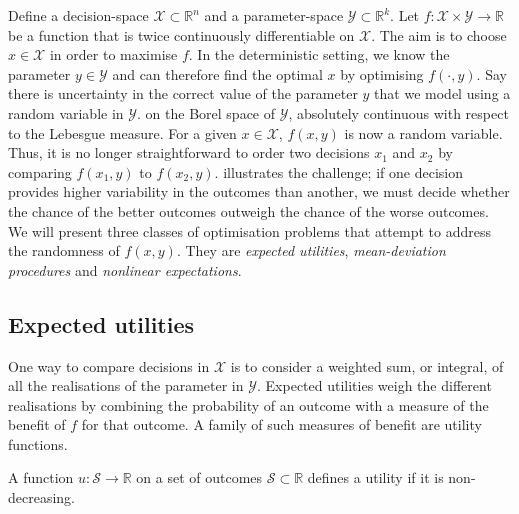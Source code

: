\documentclass[main.tex]{subfiles}
\begin{document}
Define a decision-space $\mathcal{X}\subset \mathbb{R}^n$ and a
parameter-space $\mathcal{Y}\subset \mathbb{R}^k$.
Let $f:\mathcal{X}\times\mathcal{Y}\to\mathbb{R}$ be a function that
is twice continuously differentiable on $\mathcal{X}$.
The aim is to choose $x\in\mathcal{X}$ in order to maximise $f$.
In the deterministic setting, we know the parameter
$y\in\mathcal{Y}$ and can therefore find the optimal $x$ by optimising
$f(\cdot,y)$.
Say there is uncertainty in the correct value of the parameter $y$ that
we model using a random variable in $\mathcal{Y}$.
on the Borel space of $\mathcal{Y}$, absolutely continuous with respect
to the Lebesgue measure.
For a given $x\in\mathcal{X}$, $f(x,y)$ is now a random variable.
Thus, it is no longer straightforward to order two decisions $x_1$ and
$x_2$ by comparing $f(x_1,y)$ to $f(x_2,y)$.
 illustrates the challenge;
if one decision provides higher variability in the outcomes than
another, we must decide whether the chance of the better outcomes
outweigh the chance of the worse outcomes.
We will present three classes of optimisation problems that attempt to
address the randomness of $f(x,y)$. They are \emph{expected
  utilities}, \emph{mean-deviation procedures} and \emph{nonlinear
  expectations}.

\subsection{Expected utilities}
One way to compare decisions in $\mathcal{X}$ is to consider a weighted
sum, or integral, of all the realisations of the parameter in $\mathcal{Y}$.
Expected utilities weigh the different realisations by combining the
probability of an outcome with a measure of the benefit of $f$ for that
outcome.
A family of such measures of benefit are utility functions.
\begin{mydef}
  A function $u:\mathcal{S}\to\mathbb{R}$ on a set of outcomes
  $\mathcal{S}\subset \mathbb{R}$ defines a utility if
  it is non-decreasing.
\end{mydef}
\end{document}
